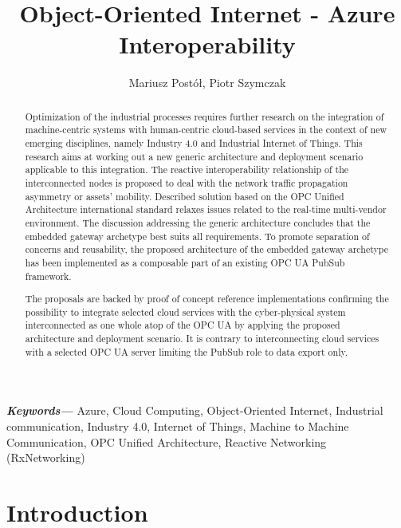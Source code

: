 \documentclass{article}
\title{Object-Oriented Internet - Azure Interoperability}
\author[1]{Mariusz Postół, Piotr Szymczak}
\affil[1]
{
 Lodz University of Technology\\
 Institute of Information Technology\\
 ul. Wólczańska 215, 90-924 Lodz, Poland\\
 mailto:mariusz.postol@p.lodz.pl
}
\date{}
\providecommand{\keywords}[1]{ \small \textbf{\textit{Keywords---}} #1 }
\begin{document}
\maketitle

\begin{abstract}

      Optimization of the industrial processes requires further research on the integration of machine-centric systems with human-centric cloud-based services in the context of new emerging disciplines, namely Industry 4.0 and Industrial Internet of Things. This research aims at working out a new generic architecture and deployment scenario applicable to this integration. The reactive interoperability relationship of the interconnected nodes is proposed to deal with the network traffic propagation asymmetry or assets' mobility. Described solution based on the OPC Unified Architecture international standard relaxes issues related to the real-time multi-vendor environment. The discussion addressing the generic architecture concludes that the embedded gateway archetype best suits all requirements. To promote separation of concerns and reusability, the proposed architecture of the embedded gateway archetype has been implemented as a composable part of an existing OPC UA PubSub framework.

      The proposals are backed by proof of concept reference implementations confirming the possibility to integrate selected cloud services with the cyber-physical system interconnected as one whole atop of the OPC UA by applying the proposed architecture and deployment scenario. It is contrary to interconnecting cloud services with a selected OPC UA server limiting the PubSub role to data export only.

\end{abstract}

\keywords{ Azure, Cloud Computing, Object-Oriented Internet, Industrial communication, Industry 4.0, Internet of Things, Machine to Machine Communication, OPC Unified Architecture,
Reactive Networking (RxNetworking)  }

\maketitle


\section{Introduction}\label{introduction}
\end{document}
